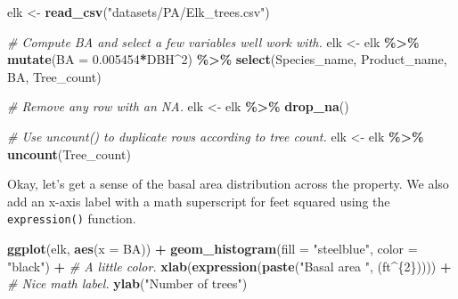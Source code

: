 \documentclass[
  11pt,
]{krantz}
\newenvironment{Shaded}{\begin{snugshade}}{\end{snugshade}}
\newcommand{\CommentTok}[1]{\textcolor[rgb]{0.56,0.35,0.01}{\textit{#1}}}
\newcommand{\DataTypeTok}[1]{\textcolor[rgb]{0.13,0.29,0.53}{#1}}
\newcommand{\DecValTok}[1]{\textcolor[rgb]{0.00,0.00,0.81}{#1}}
\newcommand{\FloatTok}[1]{\textcolor[rgb]{0.00,0.00,0.81}{#1}}
\newcommand{\KeywordTok}[1]{\textcolor[rgb]{0.13,0.29,0.53}{\textbf{#1}}}
\newcommand{\NormalTok}[1]{#1}
\newcommand{\OperatorTok}[1]{\textcolor[rgb]{0.81,0.36,0.00}{\textbf{#1}}}
\newcommand{\StringTok}[1]{\textcolor[rgb]{0.31,0.60,0.02}{#1}}
\theoremstyle{definition}
\theoremstyle{definition}
\theoremstyle{definition}
\theoremstyle{definition}
\theoremstyle{remark}
\begin{document}
\begin{Shaded}
\begin{Highlighting}[]
\NormalTok{elk \textless{}{-}}\StringTok{ }\KeywordTok{read\_csv}\NormalTok{(}\StringTok{"datasets/PA/Elk\_trees.csv"}\NormalTok{)}

\CommentTok{\# Compute BA and select a few variables we\textquotesingle{}ll work with.}
\NormalTok{elk \textless{}{-}}\StringTok{ }\NormalTok{elk }\OperatorTok{\%\textgreater{}\%}\StringTok{ }
\StringTok{  }\KeywordTok{mutate}\NormalTok{(}\DataTypeTok{BA =} \FloatTok{0.005454}\OperatorTok{*}\NormalTok{DBH}\OperatorTok{\^{}}\DecValTok{2}\NormalTok{) }\OperatorTok{\%\textgreater{}\%}\StringTok{ }
\StringTok{  }\KeywordTok{select}\NormalTok{(Species\_name, Product\_name, BA, Tree\_count)}

\CommentTok{\# Remove any row with an NA.}
\NormalTok{elk \textless{}{-}}\StringTok{ }\NormalTok{elk }\OperatorTok{\%\textgreater{}\%}\StringTok{ }
\StringTok{  }\KeywordTok{drop\_na}\NormalTok{()}

\CommentTok{\# Use uncount() to duplicate rows according to tree count.}
\NormalTok{elk \textless{}{-}}\StringTok{ }\NormalTok{elk }\OperatorTok{\%\textgreater{}\%}\StringTok{ }
\StringTok{  }\KeywordTok{uncount}\NormalTok{(Tree\_count)}
\end{Highlighting}
\end{Shaded}

Okay, let's get a sense of the basal area distribution across the property. We also add an x-axis label with a math superscript for feet squared using the \texttt{expression()} function.

\begin{Shaded}
\begin{Highlighting}[]
\KeywordTok{ggplot}\NormalTok{(elk, }\KeywordTok{aes}\NormalTok{(}\DataTypeTok{x =}\NormalTok{ BA)) }\OperatorTok{+}
\StringTok{  }\KeywordTok{geom\_histogram}\NormalTok{(}\DataTypeTok{fill =} \StringTok{"steelblue"}\NormalTok{, }\DataTypeTok{color =} \StringTok{"black"}\NormalTok{) }\OperatorTok{+}\StringTok{ }\CommentTok{\# A little color.}
\StringTok{  }\KeywordTok{xlab}\NormalTok{(}\KeywordTok{expression}\NormalTok{(}\KeywordTok{paste}\NormalTok{(}\StringTok{"Basal area "}\NormalTok{, (ft}\OperatorTok{\^{}}\NormalTok{\{}\DecValTok{2}\NormalTok{\})))) }\OperatorTok{+}\StringTok{ }\CommentTok{\# Nice math label.}
\StringTok{  }\KeywordTok{ylab}\NormalTok{(}\StringTok{"Number of trees"}\NormalTok{)}
\end{Highlighting}
\end{Shaded}
\end{document}
